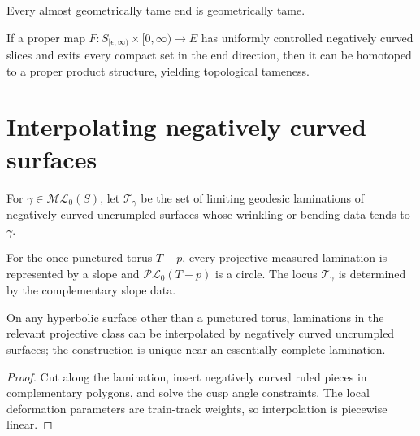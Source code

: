 \begin{corollary}
\label{thurston-ch09-almost-implies-tame}
 Every almost geometrically tame end is geometrically tame.
\end{corollary}

\begin{proposition}
\label{thurston-ch09-proper-interpolation}
 If a proper map $F:S_{[\epsilon,\infty)}\times[0,\infty)\to E$ has uniformly controlled negatively curved slices and exits every compact set in the end direction, then it can be homotoped to a proper product structure, yielding topological tameness.
\end{proposition}

\section{Interpolating negatively curved surfaces}

\begin{definition}
\label{thurston-ch09-t-gamma}
 For $\gamma\in\mathcal{ML}_0(S)$, let $\mathcal T_\gamma$ be the set of limiting geodesic laminations of negatively curved uncrumpled surfaces whose wrinkling or bending data tends to $\gamma$.
\end{definition}

\begin{proposition}
\label{thurston-ch09-punctured-torus-pl}
 For the once-punctured torus $T-p$, every projective measured lamination is represented by a slope and $\mathcal{PL}_0(T-p)$ is a circle. The locus $\mathcal T_\gamma$ is determined by the complementary slope data.
\end{proposition}

\begin{proposition}
\label{thurston-ch09-negative-surface-interpolation}
 On any hyperbolic surface other than a punctured torus, laminations in the relevant projective class can be interpolated by negatively curved uncrumpled surfaces; the construction is unique near an essentially complete lamination.
\end{proposition}
\begin{proof}\sketch Cut along the lamination, insert negatively curved ruled pieces in complementary polygons, and solve the cusp angle constraints. The local deformation parameters are train-track weights, so interpolation is piecewise linear.\end{proof}

